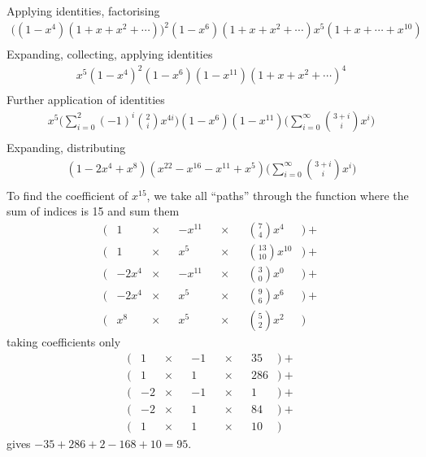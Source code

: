 \documentclass[10pt]{article}
\begin{document}
\begin{enumerate}
                Applying identities, factorising
                \begin{align*}
                    \Big((1 - x^4)(1 + x + x^2 + \cdots)\Big)^2(1 - x^6)(1 + x + x^2 + \cdots)x^5(1 + x + \cdots + x^{10}) \\
                \end{align*}
                Expanding, collecting, applying identities
                \begin{align*}
                    x^5(1 - x^4)^2(1 - x^6)(1 - x^{11})(1 + x + x^2 + \cdots)^4 \\
                \end{align*}
                Further application of identities
                \begin{align*}
                    x^5\Bigg(\sum_{i=0}^2(-1)^i\binom{2}{i}x^{4i}\Bigg)(1 - x^6)(1 - x^{11})\Bigg(\sum_{i=0}^\infty\binom{3+i}{i}x^i\Bigg) \\
                \end{align*}
                Expanding, distributing
                \begin{align*}
                    (1 - 2x^4 + x^8)(x^{22} - x^{16} - x^{11} + x^5)\Bigg(\sum_{i=0}^\infty\binom{3+i}{i}x^i\Bigg) \\
                \end{align*}
                To find the coefficient of $x^{15}$, we take all ``paths''
                through the function where the sum of indices is 15 and sum
                them
                \begin{align*}
                    \Big(&1 &\times& &-x^{11}& &\times& &\binom{7}{4}x^{4}&\Big) + \\
                    \Big(&1 &\times& &x^{5}& &\times& &\binom{13}{10}x^{10}&\Big) + \\
                    \Big(&-2x^4 &\times& &-x^{11}& &\times& &\binom{3}{0}x^{0}&\Big) + \\
                    \Big(&-2x^4 &\times& &x^{5}& &\times& &\binom{9}{6}x^{6}&\Big) + \\
                    \Big(&x^8 &\times& &x^{5}& &\times& &\binom{5}{2}x^{2}&\Big)
                \end{align*}
                taking coefficients only
                \begin{align*}
                    (&1 &\times& &-1& &\times& &35&) + \\
                    (&1 &\times& &1& &\times& &286&) + \\
                    (&-2 &\times& &-1& &\times& &1&) + \\
                    (&-2 &\times& &1& &\times& &84&) + \\
                    (&1 &\times& &1& &\times& &10&)
                \end{align*}
                gives $-35 + 286 + 2 - 168 + 10 = 95$.
    \end{enumerate}
\end{document}
